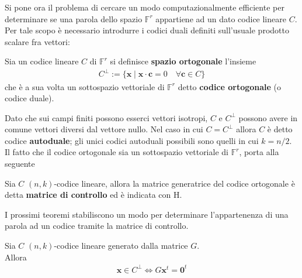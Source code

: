 Si pone ora il problema di cercare un modo computazionalmente efficiente per determinare se una parola dello spazio $ \mathbb{F}^{r} $ appartiene ad un dato codice lineare $C$. Per tale scopo è necessario introdurre i codici duali definiti sull'usuale prodotto scalare fra vettori:
\begin{definizione}
   Sia un codice lineare $C$ di $\mathbb{F}^{r}$ si definisce {\bf spazio ortogonale} l'insieme 
   \begin{align*}
      C^{\perp} 
      := \lbrace \mathbf{x} \mid \mathbf{x} \cdot \mathbf{c} = 0 \quad \forall \mathbf{c} \in C \rbrace
   \end{align*}
   che è a sua volta un sottospazio vettoriale di $\mathbb{F}^{r}$ detto {\bf codice ortogonale} (o codice duale).
\end{definizione}
\noindent
Dato che sui campi finiti possono esserci vettori isotropi, $C$ e $C^{\perp}$ possono avere in comune vettori diversi dal vettore nullo. Nel caso in cui $C = C^{\perp}$ allora $C$ è detto codice {\bf autoduale}; gli unici codici autoduali possibili sono quelli in cui $k=n/2$. Il fatto che il codice ortogonale sia un sottospazio vettoriale di $\mathbb{F}^{r}$, porta alla seguente
\begin{definizione}
   Sia $C$ $(n,k)$-codice lineare, allora la matrice generatrice del codice ortogonale è detta {\bf matrice di controllo} ed è indicata con H.
\end{definizione}
\noindent
I prossimi teoremi stabiliscono un modo per determinare l'appartenenza di una parola ad un codice tramite la matrice di controllo.
\begin{teorema} \label{teorFondMatrGen}
   Sia $C$ $(n,k)$-codice lineare generato dalla matrice $G$.\\ 
   Allora
   \begin{align*}
      \mathbf{x} \in C^{\perp} \iff G \mathbf{x}^{t} = \mathbf{0}^{t}
   \end{align*}
\end{teorema}
